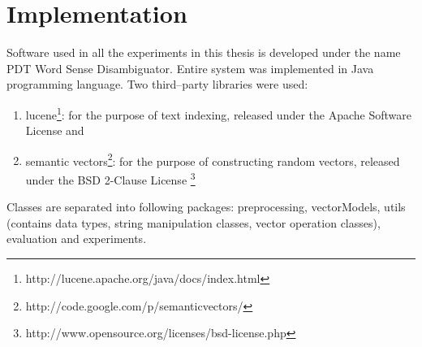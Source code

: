 \chapter{Implementation}
Software used in all the experiments in this thesis is developed under the name PDT Word Sense Disambiguator. Entire system was implemented in Java programming language. Two third--party libraries were used: 
\begin{enumerate}
\item lucene\footnote{http://lucene.apache.org/java/docs/index.html}: for the purpose of text indexing,  released under the Apache Software License and
\item semantic vectors\footnote{http://code.google.com/p/semanticvectors/}: for the purpose of constructing random vectors, released under the BSD 2-Clause License   \footnote{http://www.opensource.org/licenses/bsd-license.php}
\end{enumerate}
Classes are separated into following packages: preprocessing, vectorModels, utils (contains data types, string manipulation classes, vector operation classes), evaluation and experiments. 

